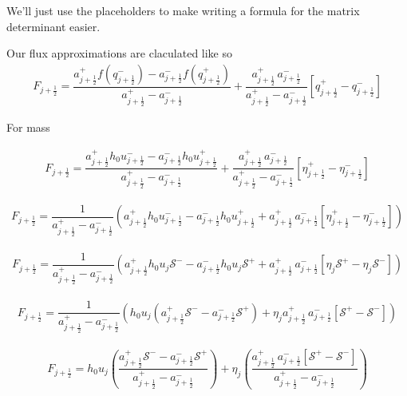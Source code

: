 \documentclass[12pt]{article}
\begin{document}
We'll just use the placeholders to make writing a formula for the matrix determinant easier.

Our flux approximations are claculated like so
\begin{gather}
F_{j+\frac{1}{2}} = \dfrac{a^+_{j+\frac{1}{2}} f\left(q^-_{j+\frac{1}{2}}\right) - a^-_{j+\frac{1}{2}} f\left(q^+_{j+\frac{1}{2}}\right)}{a^+_{j+\frac{1}{2}} - a^-_{j+\frac{1}{2}}}  + \dfrac{a^+_{j+\frac{1}{2}} \, a^-_{j+\frac{1}{2}}}{a^+_{j+\frac{1}{2}} - a^-_{j+\frac{1}{2}}} \left [ q^+_{j+\frac{1}{2}} - q^-_{j+\frac{1}{2}} \right ]
\end{gather}

For mass

\begin{gather}
F_{j+\frac{1}{2}} = \dfrac{a^+_{j+\frac{1}{2}} h_0u^-_{j+\frac{1}{2}} - a^-_{j+\frac{1}{2}} h_0u^+_{j+\frac{1}{2}}}{a^+_{j+\frac{1}{2}} - a^-_{j+\frac{1}{2}}}  + \dfrac{a^+_{j+\frac{1}{2}} \, a^-_{j+\frac{1}{2}}}{a^+_{j+\frac{1}{2}} - a^-_{j+\frac{1}{2}}} \left [ \eta^+_{j+\frac{1}{2}} - \eta^-_{j+\frac{1}{2}} \right ]
\end{gather}

\begin{gather}
F_{j+\frac{1}{2}} = \dfrac{1}{a^+_{j+\frac{1}{2}} - a^-_{j+\frac{1}{2}}} \left(a^+_{j+\frac{1}{2}} h_0u^-_{j+\frac{1}{2}} - a^-_{j+\frac{1}{2}} h_0u^+_{j+\frac{1}{2}} + a^+_{j+\frac{1}{2}} \, a^-_{j+\frac{1}{2}}\left [ \eta^+_{j+\frac{1}{2}} - \eta^-_{j+\frac{1}{2}} \right ]\right) 
\end{gather}

\begin{gather}
F_{j+\frac{1}{2}} = \dfrac{1}{a^+_{j+\frac{1}{2}} - a^-_{j+\frac{1}{2}}} \left(a^+_{j+\frac{1}{2}} h_0u_{j} \mathcal{S^-} - a^-_{j+\frac{1}{2}} h_0u_{j} \mathcal{S^+} + a^+_{j+\frac{1}{2}} \, a^-_{j+\frac{1}{2}}\left [ \eta_{j}\mathcal{S^+} - \eta_{j}\mathcal{S^-} \right ]\right) 
\end{gather}

\begin{gather}
F_{j+\frac{1}{2}} = \dfrac{1}{a^+_{j+\frac{1}{2}} - a^-_{j+\frac{1}{2}}} \left(h_0 u_j \left(a^+_{j+\frac{1}{2}} \mathcal{S^-} - a^-_{j+\frac{1}{2}} \mathcal{S^+} \right) + \eta_{j} a^+_{j+\frac{1}{2}} \, a^-_{j+\frac{1}{2}}\left [ \mathcal{S^+} -\mathcal{S^-} \right ]\right) 
\end{gather}

\begin{gather}
F_{j+\frac{1}{2}} = h_0u_j \left(\dfrac{a^+_{j+\frac{1}{2}} \mathcal{S^-} - a^-_{j+\frac{1}{2}} \mathcal{S^+} }{a^+_{j+\frac{1}{2}} - a^-_{j+\frac{1}{2}}}\right)   + \eta_{j}  \left(\dfrac{a^+_{j+\frac{1}{2}} \, a^-_{j+\frac{1}{2}}\left [ \mathcal{S^+} -\mathcal{S^-} \right ] }{a^+_{j+\frac{1}{2}} - a^-_{j+\frac{1}{2}}}\right) 
\end{gather}
\end{document}

